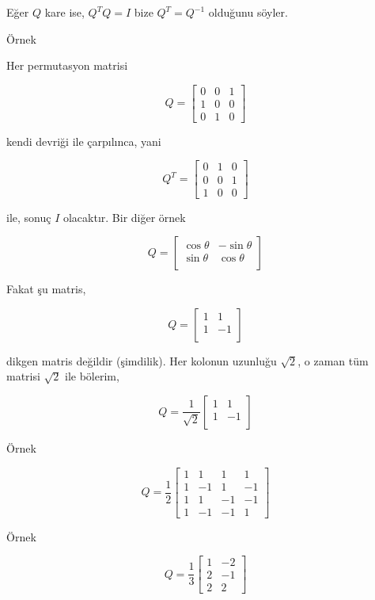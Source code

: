 \documentclass[12pt,fleqn]{article}\usepackage{../../common}
\begin{document}
Eğer $Q$ kare ise, $Q^TQ = I$  bize $Q^T = Q^{-1}$ olduğunu söyler. 

Örnek 

Her permutasyon matrisi 

$$
Q = 
\left[\begin{array}{rrr}
0 & 0 & 1 \\
1 & 0 & 0 \\
0 & 1 & 0 
\end{array}\right]
$$

kendi devriği ile çarpılınca, yani 

$$
Q^T = 
\left[\begin{array}{rrr}
0 & 1 & 0 \\
0 & 0 & 1 \\
1 & 0 & 0 
\end{array}\right]
$$

ile, sonuç $I$ olacaktır. Bir diğer örnek 

$$Q = 
\left[\begin{array}{cc}
\cos \theta & -\sin \theta \\
\sin \theta & \cos \theta \\
\end{array}\right]
$$

Fakat şu matris,

$$Q = 
\left[\begin{array}{cc}
1 & 1 \\
1 & -1 \\
\end{array}\right]
$$

dikgen matris değildir (şimdilik). Her kolonun uzunluğu $\sqrt{2}$, o
zaman tüm matrisi $\sqrt{2}$ ile bölerim,

$$Q = \frac{1}{\sqrt{2}}
\left[\begin{array}{cc}
1 & 1 \\
1 & -1 \\
\end{array}\right]
$$

Örnek 

$$Q = \frac{ 1}{2}
\left[\begin{array}{rrrr}
1 & 1& 1& 1 \\
1 & -1& 1& -1 \\
1 & 1& -1& -1 \\
1 & -1& -1& 1 
\end{array}\right]
$$

Örnek 

$$Q = \frac{ 1}{3}
\left[\begin{array}{rr}
1 & -2 \\
2 & -1 \\
2 & 2 
\end{array}\right]
$$
\end{document}
